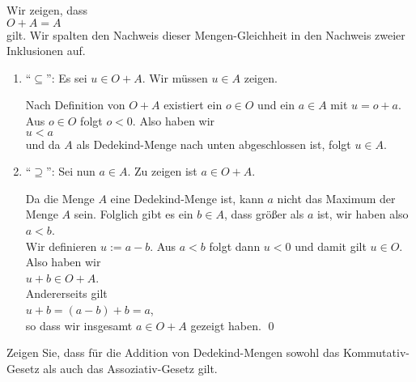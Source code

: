 \solution
Wir zeigen, dass
\\[0.2cm]
\hspace*{1.3cm}
$O + A = A$
\\[0.2cm]
gilt.  Wir spalten den Nachweis dieser Mengen-Gleichheit in den Nachweis zweier Inklusionen auf.
\begin{enumerate}
\item ``$\subseteq$'': Es sei $u \in O + A$.  Wir müssen $u \in A$ zeigen.

      Nach Definition von $O + A$ existiert ein $o \in O$
      und ein $a \in A$ mit $u = o + a$.  Aus $o \in O$ folgt $o < 0$.  Also haben wir
      \\[0.2cm]
      \hspace*{1.3cm}
      $u < a$
      \\[0.2cm]
      und da $A$ als Dedekind-Menge nach unten abgeschlossen ist, folgt $u \in A$.
\item ``$\supseteq$'': Sei nun $a \in A$.  Zu zeigen ist $a \in O + A$.

      Da die Menge $A$ eine Dedekind-Menge ist, kann $a$ nicht das Maximum der Menge $A$ sein.
      Folglich gibt es ein $b \in A$, dass größer als $a$ ist, wir haben also
      \\[0.2cm]
      \hspace*{1.3cm}
      $a < b$.
      \\[0.2cm]
      Wir definieren $u := a - b$.  Aus $a < b$ folgt dann $u < 0$ und damit gilt $u \in O$.
      Also haben wir
      \\[0.2cm]
      \hspace*{1.3cm}
      $u + b \in O + A$.
      \\[0.2cm]
      Andererseits gilt
      \\[0.2cm]
      \hspace*{1.3cm}
      $u + b = (a - b) + b = a$,
      \\[0.2cm]
      so dass wir insgesamt $a \in O + A$ gezeigt haben. \qed
\end{enumerate}

\exercise
Zeigen Sie, dass für die Addition von Dedekind-Mengen sowohl das Kommutativ-Gesetz als auch das
Assoziativ-Gesetz gilt. \eox

